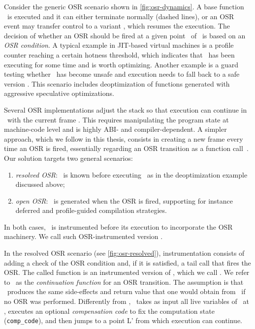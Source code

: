 \noindent Consider the generic OSR scenario shown in \myfigure\ref{fig:osr-dynamics}. A base function \fbase\ is executed and it can either terminate normally (dashed lines), or an OSR event may transfer control to a variant \fvariant, which resumes the execution. The decision of whether an OSR should be fired at a given point \osrpoint\ of \fbase\ is based on an {\em OSR condition}. A typical example in JIT-based virtual machines is a profile counter reaching a certain hotness threshold, which indicates that \fbase\ has been executing for some time and is worth optimizing. Another example is a guard testing whether \fbase\ has become unsafe and execution needs to fall back to a safe version \fvariant. This scenario includes deoptimization of functions generated with aggressive speculative optimizations.

Several OSR implementations adjust the stack so that execution can continue in \fvariant\ with the current frame \cite{Chambers91, Chambers92, Holzle92, Suganuma06}. This requires manipulating the program state at machine-code level and is highly ABI- and compiler-dependent. A simpler approach, which we follow in this thesis, consists in creating a new frame every time an OSR is fired, essentially regarding an OSR transition as a function call~\cite{Fink03,Lameed13,Pizlo14}. Our solution targets two general scenarios:
\begin{enumerate}[parsep=0pt]
 \item {\em resolved OSR}: \fvariant\ is known before executing \fbase\ as in the deoptimization example discussed above;
 \item {\em open OSR}: \fvariant\ is generated when the OSR is fired, supporting for instance deferred and profile-guided compilation strategies.
\end{enumerate}

\noindent In both cases, \fbase\ is instrumented before its execution to incorporate the OSR machinery. We call such OSR-instrumented version \fosrfrom.

In the resolved OSR scenario (see \myfigure\ref{fig:osr-resolved}), instrumentation consists of adding a check of the OSR condition and, if it is satisfied, a tail call that fires the OSR. The called function is an instrumented version of \fvariant, which we call \fosrto. We refer to \fosrto\ as the {\em continuation function} for an OSR transition. The assumption is that \fosrto\ produces the same side-effects and return value that one would obtain from \fbase\ if no OSR was performed. Differently from \fvariant, \fosrto\ takes as input all live variables of \fbase\ at \osrpoint, executes an optional {\em compensation code} to fix the computation state ({\tt comp\_code}), and then jumps to a point \textsf{L'} from which execution can continue.

